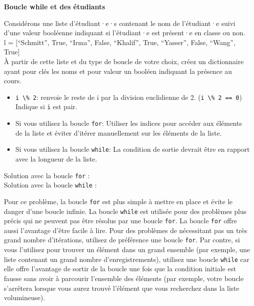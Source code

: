     
    \begin{Exercice}[10 minutes] \textbf{Boucle while et des étudiants}
      	
      	Considérons une liste d'étudiant·e·s contenant le nom de l'étudiant·e suivi d'une valeur booléenne indiquant si l'étudiant·e est présent·e en classe ou non. \\
      	
      	l = [``Schmitt'', True, ``Irma'', False, ``Khalif'', True, ``Yasser'', False, ``Wang'', True] \\
      	
      	À partir de cette liste et du type de boucle de votre choix, créez un dictionnaire ayant pour clés les noms et pour valeur un booléen indiquant la présence au cours.
    
        \begin{conseil}
           \begin{itemize}
           		\item \lstinline{i \% 2}: renvoie le reste de i par la division euclidienne de 2. (\lstinline{i \% 2 == 0}) Indique si \lstinline{i} est pair.
           	\item Si vous utilisez la boucle \lstinline{for}: Utiliser les indices pour accéder aux éléments de la liste et éviter d'itérer manuellement sur les éléments de la liste.
           	\item Si vous utilisez la boucle \lstinline{while}: La condition de sortie devrait être en rapport avec la longueur de la liste.
           \end{itemize}
		     
        \end{conseil}
        
        \begin{solution}
        	Solution avec la boucle \lstinline{for} : \\
        
            
            
            Solution avec la boucle \lstinline{while} :
            
            
            
            
            Pour ce problème, la boucle \lstinline{for} est plus simple à mettre en place et évite le danger d'une boucle infinie. La boucle \lstinline{while} est utilisée pour des problèmes plus précis qui ne peuvent pas être résolus par une boucle \lstinline{for}. La boucle \lstinline{for} offre aussi l'avantage d'être facile à lire. Pour des problèmes de nécessitant pas un très grand nombre d'itérations, utilisez de préférence une boucle \lstinline{for}. Par contre, si vous l'utilisez pour trouver un élément dans un grand ensemble (par exemple, une liste contenant un grand nombre d'enregistrements), utilisez une boucle \lstinline{while} car elle offre l'avantage de sortir de la boucle une fois que la condition initiale est fausse sans avoir à parcourir l'ensemble des éléments (par exemple, votre boucle s'arrêtera lorsque vous aurez trouvé l'élément que vous recherchez dans la liste volumineuse).
            

\end{solution}
\end{Exercice}
